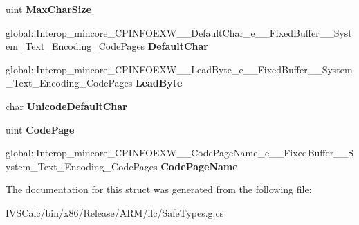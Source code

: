 \begin{DoxyCompactItemize}
\item 
\mbox{\label{struct_interop__mincore___c_p_i_n_f_o_e_x_w_____system___text___encoding___code_pages_ae4a1aad5a5d4dac2e5e89d0a2a59bac3}} 
uint {\bfseries Max\+Char\+Size}
\item 
\mbox{\label{struct_interop__mincore___c_p_i_n_f_o_e_x_w_____system___text___encoding___code_pages_a8280ef66cf094eb669a8669f13faaa03}} 
global\+::\+Interop\+\_\+mincore\+\_\+\+C\+P\+I\+N\+F\+O\+E\+X\+W\+\_\+\+\_\+\+Default\+Char\+\_\+e\+\_\+\+\_\+\+Fixed\+Buffer\+\_\+\+\_\+\+System\+\_\+\+Text\+\_\+\+Encoding\+\_\+\+Code\+Pages {\bfseries Default\+Char}
\item 
\mbox{\label{struct_interop__mincore___c_p_i_n_f_o_e_x_w_____system___text___encoding___code_pages_a4edc9fa9ef6e8fdb476647403970b22a}} 
global\+::\+Interop\+\_\+mincore\+\_\+\+C\+P\+I\+N\+F\+O\+E\+X\+W\+\_\+\+\_\+\+Lead\+Byte\+\_\+e\+\_\+\+\_\+\+Fixed\+Buffer\+\_\+\+\_\+\+System\+\_\+\+Text\+\_\+\+Encoding\+\_\+\+Code\+Pages {\bfseries Lead\+Byte}
\item 
\mbox{\label{struct_interop__mincore___c_p_i_n_f_o_e_x_w_____system___text___encoding___code_pages_aaf34527db0ad492873957ae2260cc061}} 
char {\bfseries Unicode\+Default\+Char}
\item 
\mbox{\label{struct_interop__mincore___c_p_i_n_f_o_e_x_w_____system___text___encoding___code_pages_affdb51b47895e3e19316a003038f308b}} 
uint {\bfseries Code\+Page}
\item 
\mbox{\label{struct_interop__mincore___c_p_i_n_f_o_e_x_w_____system___text___encoding___code_pages_a67d3a9f163d7268059a6dab4979f55db}} 
global\+::\+Interop\+\_\+mincore\+\_\+\+C\+P\+I\+N\+F\+O\+E\+X\+W\+\_\+\+\_\+\+Code\+Page\+Name\+\_\+e\+\_\+\+\_\+\+Fixed\+Buffer\+\_\+\+\_\+\+System\+\_\+\+Text\+\_\+\+Encoding\+\_\+\+Code\+Pages {\bfseries Code\+Page\+Name}
\end{DoxyCompactItemize}


The documentation for this struct was generated from the following file\+:\begin{DoxyCompactItemize}
\item 
I\+V\+S\+Calc/bin/x86/\+Release/\+A\+R\+M/ilc/Safe\+Types.\+g.\+cs\end{DoxyCompactItemize}
